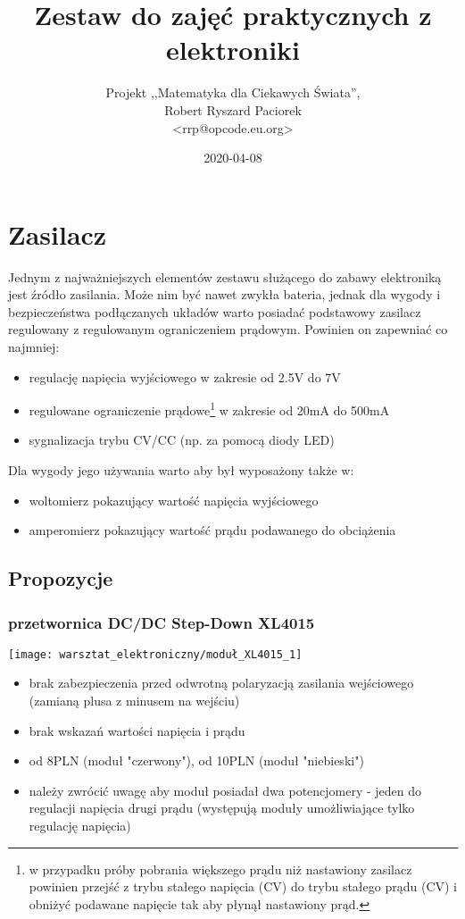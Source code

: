 \documentclass{pdfBooklets}
\title{Zestaw do zajęć praktycznych z elektroniki}
\author{%
	Projekt ,,Matematyka dla Ciekawych Świata'',\\
	Robert Ryszard Paciorek\\\normalsize\ttfamily <rrp@opcode.eu.org>
}
\date  {2020-04-08}
\newcommand\wada{\item[\textbf{\ttfamily -}]}
\newcommand\info{\item[\textbf{\ttfamily *}]}
\newcommand\uwaga{\item[\textbf{\ttfamily !}]}
\begin{document}
\maketitle

\section{Zasilacz}
	Jednym z najważniejszych elementów zestawu służącego do zabawy elektroniką jest źródło zasilania.
	Może nim być nawet zwykła bateria, jednak dla wygody i bezpieczeństwa podłączanych układów warto posiadać podstawowy zasilacz regulowany z regulowanym ograniczeniem prądowym.
	Powinien on zapewniać co najmniej:
	\begin{itemize}
		\item regulację napięcia wyjściowego w zakresie od 2.5V do 7V
		\item regulowane ograniczenie prądowe\footnote{
			w przypadku próby pobrania większego prądu niż nastawiony zasilacz powinien
			przejść z trybu stałego napięcia (CV) do trybu stałego prądu (CV)
			i obniżyć podawane napięcie tak aby płynął nastawiony prąd.
		} w zakresie od 20mA do 500mA
		\item sygnalizacja trybu CV/CC (np. za pomocą diody LED)
	\end{itemize}
	Dla wygody jego używania warto aby był wyposażony także w:
	\begin{itemize}
		\item woltomierz pokazujący wartość napięcia wyjściowego
		\item amperomierz pokazujący wartość prądu podawanego do obciążenia
	\end{itemize}
	
	\subsection{Propozycje}
	
	\subsubsection{przetwornica DC/DC Step-Down XL4015}
		\begin{center}
			\texttt{[image: warsztat\_elektroniczny/moduł\_XL4015\_1]}
		\end{center}
		\begin{itemize}
			\wada brak zabezpieczenia przed odwrotną polaryzacją zasilania wejściowego (zamianą plusa z minusem na wejściu)
			\wada brak wskazań wartości napięcia i prądu
			\info od 8PLN (moduł "czerwony"), od 10PLN (moduł "niebieski")
			\uwaga należy zwrócić uwagę aby moduł posiadał dwa potencjomery - jeden do regulacji napięcia drugi prądu (występują moduły umożliwiające tylko regulację napięcia)
		\end{itemize}
	
\end{document}
